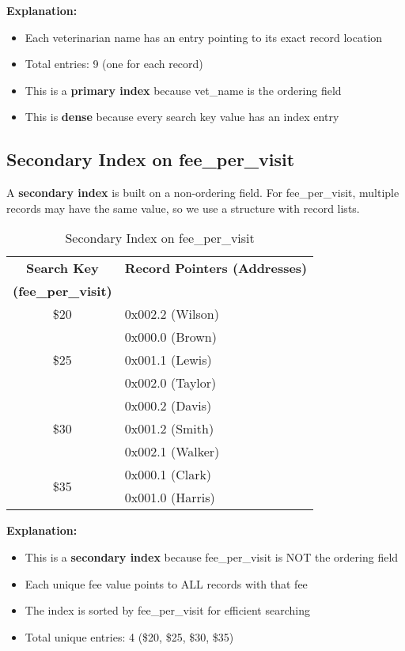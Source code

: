 \documentclass[12pt]{article}
\begin{document}
\textbf{Explanation:}
\begin{itemize}
    \item Each veterinarian name has an entry pointing to its exact record location
    \item Total entries: 9 (one for each record)
    \item This is a \textbf{primary index} because vet\_name is the ordering field
    \item This is \textbf{dense} because every search key value has an index entry
\end{itemize}

\newpage

\subsection{Secondary Index on fee\_per\_visit}

A \textbf{secondary index} is built on a non-ordering field. For fee\_per\_visit, multiple records may have the same value, so we use a structure with record lists.

\begin{table}[h]
\centering
\begin{tabular}{|c|p{6cm}|}
\hline
\textbf{Search Key} & \textbf{Record Pointers (Addresses)} \\
\textbf{(fee\_per\_visit)} & \\
\hline
\$20 & 0x002.2 (Wilson) \\
\hline
\multirow{3}{*}{\$25} & 0x000.0 (Brown) \\
 & 0x001.1 (Lewis) \\
 & 0x002.0 (Taylor) \\
\hline
\multirow{3}{*}{\$30} & 0x000.2 (Davis) \\
 & 0x001.2 (Smith) \\
 & 0x002.1 (Walker) \\
\hline
\multirow{2}{*}{\$35} & 0x000.1 (Clark) \\
 & 0x001.0 (Harris) \\
\hline
\end{tabular}
\caption{Secondary Index on fee\_per\_visit}
\end{table}

\textbf{Explanation:}
\begin{itemize}
    \item This is a \textbf{secondary index} because fee\_per\_visit is NOT the ordering field
    \item Each unique fee value points to ALL records with that fee
    \item The index is sorted by fee\_per\_visit for efficient searching
    \item Total unique entries: 4 (\$20, \$25, \$30, \$35)
\end{itemize}
\end{document}
